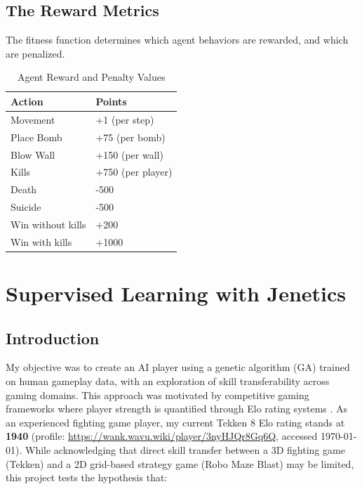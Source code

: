 \documentclass[sigconf]{acmart} %
\begin{document}
\subsection{The Reward Metrics}
The fitness function determines which agent behaviors are rewarded, and which are penalized.
\begin{table}[htbp]
\centering

\caption{Agent Reward and Penalty Values}

\begin{tabular}{l|l}
\textbf{Action} & \textbf{Points}  \\
\hline
Movement & +1 (per step) \\
\hline
Place Bomb & +75 (per bomb) \\
\hline
Blow Wall & +150 (per wall) \\
\hline
Kills & +750 (per player) \\
\hline
Death  & -500  \\
\hline
Suicide & -500 \\
\hline
Win without kills & +200  \\
\hline
Win with kills & +1000  \\
\hline
\end{tabular}
\end{table}


\section{Supervised Learning with Jenetics}
\subsection{Introduction}
My objective was to create an AI player using a genetic algorithm (GA) trained on human gameplay data, with an exploration of skill transferability across gaming domains. 
This approach was motivated by competitive gaming frameworks where player strength is quantified through Elo rating systems \cite{elo1978}. 
As an experienced fighting game player, my current Tekken 8 Elo rating stands at \textbf{1940} (profile: \url{https://wank.wavu.wiki/player/3nyHJQr8Gq6Q}, accessed \today). 
While acknowledging that direct skill transfer between a 3D fighting game (Tekken) and a 2D grid-based strategy game (Robo Maze Blast) may be limited, this project tests the hypothesis that:
\begin{center}
\end{center}
\end{document}
